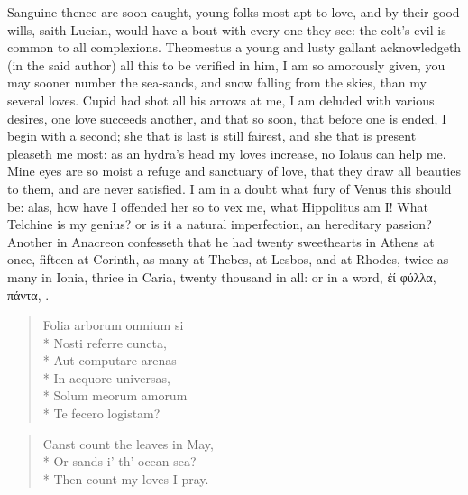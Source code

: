 Sanguine thence are soon caught, young folks most apt to love, and by
their good wills, saith Lucian, would have a bout with every one
they see: the colt's evil is common to all complexions. Theomestus a
young and lusty gallant acknowledgeth (in the said author) all this to
be verified in him, I am so amorously given, you may sooner
number the sea-sands, and snow falling from the skies, than my several
loves. Cupid had shot all his arrows at me, I am deluded with various
desires, one love succeeds another, and that so soon, that before one
is ended, I begin with a second; she that is last is still fairest, and
she that is present pleaseth me most: as an hydra's head my loves
increase, no Iolaus can help me. Mine eyes are so moist a refuge and
sanctuary of love, that they draw all beauties to them, and are never
satisfied. I am in a doubt what fury of Venus this should be: alas, how
have I offended her so to vex me, what Hippolitus am I! What Telchine
is my genius? or is it a natural imperfection, an hereditary passion?
Another in Anacreon confesseth that he had twenty sweethearts in
Athens at once, fifteen at Corinth, as many at Thebes, at Lesbos, and
at Rhodes, twice as many in Ionia, thrice in Caria, twenty thousand in
all: or in a word, \textgreek[variant=ancient]{ἐί φύλλα, πάντα}, \etc{}.

\begin{latin}
\begin{verse}
Folia arborum omnium si\\*
Nosti referre cuncta,\\*
Aut computare arenas\\*
In aequore universas,\\*
Solum meorum amorum\\*
Te fecero logistam?
\end{verse}
\end{latin}
\translationrule%
\begin{verse}
Canst count the leaves in May,\\*
Or sands i' th' ocean sea?\\*
Then count my loves I pray.
\end{verse}

